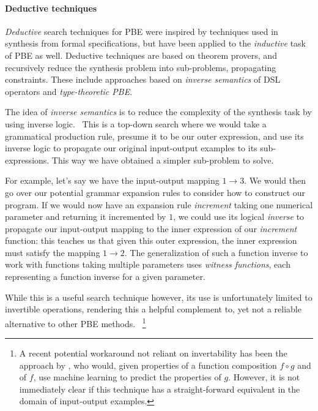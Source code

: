 \documentclass{article}
\begin{document}

\paragraph{Deductive techniques} \label{sec:deductivepbe}

\emph{Deductive} search techniques for PBE were inspired by
techniques used in synthesis from formal specifications,
but have been applied to the \emph{inductive} task of PBE as well.
Deductive techniques are based on theorem provers,
and recursively reduce the synthesis problem into sub-problems,
propagating constraints.
These include approaches based on \emph{inverse semantics} of
DSL operators and \emph{type-theoretic PBE}.


The idea of \emph{inverse semantics} is to reduce the complexity
of the synthesis task by using inverse logic.~\citep{flashmeta,prose}
This is a top-down search where we would take a grammatical
production rule, presume it to be our outer expression,
and use its inverse logic to propagate our original
input-output examples to its sub-expressions.
This way we have obtained a simpler sub-problem to solve.

For example, let's say we have the input-output mapping $1 \rightarrow 3$.
We would then go over our potential grammar expansion rules to consider how to construct our program.
If we would now have an expansion rule \emph{increment} taking one numerical parameter and returning it incremented by $1$,
we could use its logical \emph{inverse} to propagate our input-output mapping to the inner expression of our \emph{increment} function:
this teaches us that given this outer expression,
the inner expression must satisfy the mapping $1 \rightarrow 2$.
The generalization of such a function inverse to work with functions
taking multiple parameters uses \emph{witness functions},
each representing a function inverse for a given parameter.

While this is a useful search technique however, its
use is unfortunately limited to invertible operations,
rendering this a helpful complement to, yet not a
reliable alternative to other PBE methods.%
~\footnote{
    A recent potential workaround not reliant on invertability
    has been the approach by \citet{odena2020learning},
    who would, given properties of a function composition
    $f \circ g$ and of $f$, use machine learning to predict
    the properties of $g$.
    However, it is not immediately clear if this technique
    has a straight-forward equivalent in the domain of
    input-output examples.
}
\end{document}
